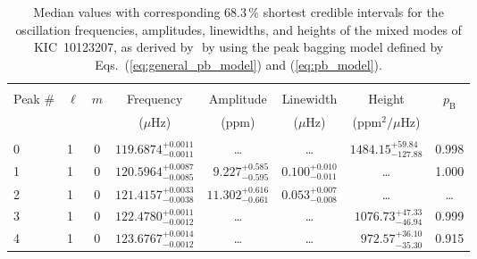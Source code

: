 \begin{table*}[!]
\caption{Median values with corresponding 68.3\,\% shortest credible intervals for the oscillation frequencies, amplitudes, linewidths, and heights of the mixed modes of KIC~10123207, as derived by \diamonds\,\,by using the peak bagging model defined by Eqs.~(\ref{eq:general_pb_model}) and (\ref{eq:pb_model}).}
\label{tab:10123207m}
\centering
\begin{tabular}{llcrrlrc}
\hline\hline
\\[-8pt]      
Peak \# & $\ell$ & $m$ & \multicolumn{1}{c}{Frequency} & \multicolumn{1}{c}{Amplitude} & \multicolumn{1}{c}{Linewidth} & \multicolumn{1}{c}{Height}& $p_\mathrm{B}$\\
 & & & \multicolumn{1}{c}{($\mu$Hz)} & \multicolumn{1}{c}{(ppm)} & \multicolumn{1}{c}{($\mu$Hz)} & \multicolumn{1}{c}{(ppm$^2/\mu$Hz)}\\
\hline \\[-8pt]

0 & 1 & 0 & $    119.6874_{-      0.0011}^{+      0.0011}$ & \multicolumn{1}{c}{\dots} & \multicolumn{1}{c}{\dots} & $     1484.15_{-      127.88}^{+       59.84}$ & 0.998\\[1pt]
1 & 1 & 0 & $    120.5964_{-      0.0085}^{+      0.0087}$ & $       9.227_{-       0.595}^{+       0.585}$ & $       0.100_{-       0.011}^{+       0.010}$ & \multicolumn{1}{c}{\dots} & 1.000\\[1pt]
2 & 1 & 0 & $    121.4157_{-      0.0038}^{+      0.0033}$ & $      11.302_{-       0.661}^{+       0.616}$ & $       0.053_{-       0.008}^{+       0.007}$ & \multicolumn{1}{c}{\dots} & \dots \\[1pt]
3 & 1 & 0 & $    122.4780_{-      0.0012}^{+      0.0011}$ & \multicolumn{1}{c}{\dots} & \multicolumn{1}{c}{\dots} & $     1076.73_{-       46.94}^{+       47.33}$ & 0.999\\[1pt]
4 & 1 & 0 & $    123.6767_{-      0.0012}^{+      0.0014}$ & \multicolumn{1}{c}{\dots} & \multicolumn{1}{c}{\dots} & $      972.57_{-       35.30}^{+       36.10}$ & 0.915\\[1pt]


\end{tabular}
\end{table*}
